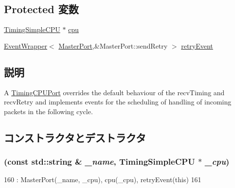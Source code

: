 \subsection*{Protected 変数}
\begin{DoxyCompactItemize}
\item 
\hyperlink{classTimingSimpleCPU_1_1TimingSimpleCPU}{TimingSimpleCPU} $\ast$ \hyperlink{classTimingSimpleCPU_1_1TimingCPUPort_ace3e131319475077fac2fa861708b0c9}{cpu}
\item 
\hyperlink{classEventWrapper}{EventWrapper}$<$ \hyperlink{classMasterPort}{MasterPort},\&MasterPort::sendRetry $>$ \hyperlink{classTimingSimpleCPU_1_1TimingCPUPort_a4afea62519871edec5a95131972c4952}{retryEvent}
\end{DoxyCompactItemize}


\subsection{説明}
A \hyperlink{classTimingSimpleCPU_1_1TimingCPUPort}{TimingCPUPort} overrides the default behaviour of the recvTiming and recvRetry and implements events for the scheduling of handling of incoming packets in the following cycle. 

\subsection{コンストラクタとデストラクタ}
\hypertarget{classTimingSimpleCPU_1_1TimingCPUPort_a5c5d45da58c60de7b1896dbc5440d644}{
\subsubsection[{TimingCPUPort}]{ (const std::string \& {\em \_\-name}, \/  {\bf TimingSimpleCPU} $\ast$ {\em \_\-cpu})}}
\label{classTimingSimpleCPU_1_1TimingCPUPort_a5c5d45da58c60de7b1896dbc5440d644}



\begin{DoxyCode}
160             : MasterPort(_name, _cpu), cpu(_cpu), retryEvent(this)
161         { }
\end{DoxyCode}


